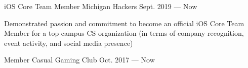 

\begin{cventries}

  \cventry
    {iOS Core Team Member} %
    {Michigan Hackers} %
    {Sept. 2019 — Now} %
    {} 
    {
      \begin{cvitems} %
        \item {Demonstrated passion and commitment to become an official iOS Core Team Member for a top campus CS organization (in terms of company recognition, event activity, and social media presence)}
      \end{cvitems}
    }
\cventry
    {Member} %
    {Casual Gaming Club} %
    {Oct. 2017 — Now} %
    {} 
    {
    }
\end{cventries}
